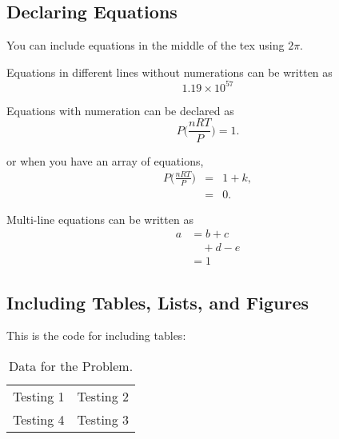 \documentclass[10pt]{article} %
\begin{document}
\subsection{Declaring Equations} %

You can include equations in the middle of the tex using $2\pi$.

Equations in different lines without numerations can be written as 
$$1.19 \times 10^{57}$$ 

Equations with numeration can be declared as
\begin{equation} %
P \Big (  \frac{nRT}{P} \Big ) = 1.
\label{myequation} %
\end{equation}

or when you have an array of equations,
\begin{eqnarray} %
P \Big (  \frac{nRT}{P} \Big ) &=& 1 + k,\\  %
&=& 0. 
\end{eqnarray}

Multi-line equations can be written as
\begin{equation}
\label{myequation_in_many_lines}
\begin{split}
a& = b+c\\
& \quad + d - e\\
& =1
\end{split}
\end{equation}



\subsection{Including Tables, Lists, and Figures} 


This is the code for including tables:
\begin{table}[htdp]
\begin{center}
\begin{tabular}{c|c} %
\hline %
Testing 1 & Testing 2\\
Testing 4 & Testing 3 \\
\hline %
\end{tabular}
\end{center}
\caption{Data for the Problem.} 
\label{mytable}
\end{table}
\end{document}
